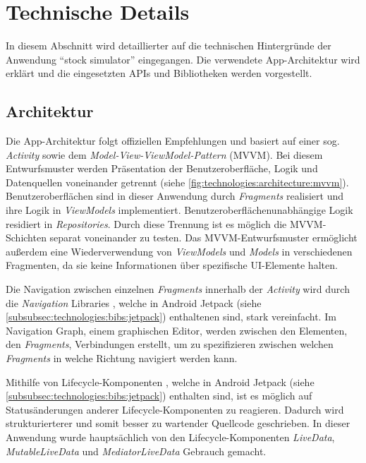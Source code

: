 \documentclass[a4paper]{article}
\begin{document}
\section{Technische Details}
\label{sec:technologies}
In diesem Abschnitt wird detaillierter auf die technischen Hintergründe der Anwendung "`stock simulator"' eingegangen. Die verwendete App-Architektur wird erklärt und die eingesetzten APIs und Bibliotheken werden vorgestellt.


\subsection{Architektur}
\label{subsec:technologies:architecture}
Die App-Architektur folgt offiziellen Empfehlungen \autocite{google_recommendations} und basiert auf einer sog. \textit{Activity} sowie dem \textit{Model-View-ViewModel-Pattern} (MVVM).
Bei diesem Entwurfsmuster werden Präsentation der Benutzeroberfläche, Logik und Datenquellen voneinander getrennt (siehe \autoref{fig:technologies:architecture:mvvm}).
Benutzeroberflächen sind in dieser Anwendung durch \textit{Fragments} realisiert und ihre Logik in \textit{ViewModels} implementiert.
Benutzeroberflächenunabhängige Logik residiert in \textit{Repositories}.
Durch diese Trennung ist es möglich die MVVM-Schichten separat voneinander zu testen.
Das MVVM-Entwurfsmuster ermöglicht außerdem eine Wiederverwendung von \textit{ViewModels} und \textit{Models} in verschiedenen Fragmenten, da sie keine Informationen über spezifische UI-Elemente halten.

Die Navigation zwischen einzelnen \textit{Fragments} innerhalb der \textit{Activity} wird durch die \textit{Navigation} Libraries \autocite{android_navigation}, welche in Android Jetpack (siehe \autoref{subsubsec:technologies:bibs:jetpack}) enthaltenen sind, stark vereinfacht. Im Navigation Graph, einem graphischen Editor, werden zwischen den Elementen, den \textit{Fragments}, Verbindungen erstellt, um zu spezifizieren zwischen welchen \textit{Fragments} in welche Richtung navigiert werden kann.

Mithilfe von Lifecycle-Komponenten \autocite{android_lifecycle}, welche in Android Jetpack (siehe \autoref{subsubsec:technologies:bibs:jetpack}) enthalten sind, ist es möglich auf Statusänderungen anderer Life\-cycle-Komponenten zu reagieren. Dadurch wird strukturierterer und somit besser zu wartender Quellcode geschrieben. In dieser Anwendung wurde hauptsächlich von den Lifecycle-Komponenten \textit{LiveData}, \textit{MutableLiveData} und \textit{MediatorLiveData} Gebrauch gemacht.
\end{document}
